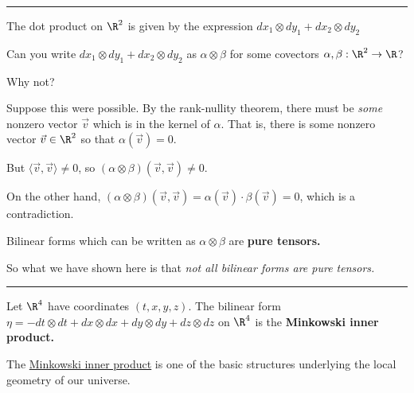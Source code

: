 \documentclass{ximera}
\begin{document}
\hrule

\begin{example}
  The dot product on $\R^2$ is given by the expression $dx_1 \otimes dy_1 + dx_2 \otimes dy_2$
\end{example}

\begin{question}
  Can you write $dx_1 \otimes dy_1 + dx_2 \otimes dy_2$ as $\alpha \otimes \beta$ for some covectors $\alpha, \beta : \R^2 \to \R$?

  \begin{solution}
    \begin{multiple-choice}
    \end{multiple-choice}
  \end{solution}

  Why not?
  \begin{free-response}
    Suppose this were possible.  By the rank-nullity theorem, there must be \textit{some} nonzero vector $\vec{v}$ which is in the kernel of $\alpha$.  That is, there is some nonzero vector $\vec{v} \in \R^2$ so that $\alpha(\vec{v}) = 0$.

    But $\langle \vec{v}, \vec{v} \rangle \neq 0$, so $(\alpha \otimes \beta)(\vec{v}, \vec{v}) \neq 0$.

    On the other hand, $(\alpha \otimes \beta)(\vec{v}, \vec{v}) = \alpha(\vec{v}) \cdot \beta(\vec{v}) = 0$, which is a contradiction.
  \end{free-response}

  \begin{definition}
    Bilinear forms which can be written as $\alpha \otimes \beta$ are \textbf{pure tensors.}
  \end{definition}
  
  So what we have shown here is that \textit{not all bilinear forms are pure tensors.}
\end{question}

\hrule

\begin{example}
  Let $\R^4$ have coordinates $(t,x,y,z)$.  The bilinear form $\eta = -dt \otimes dt +dx \otimes dx + dy\otimes dy + dz \otimes dz $ on $\R^4$ is the \textbf{Minkowski inner product.}
\end{example}

The \href{http://en.wikipedia.org/wiki/Minkowski_space}{Minkowski
  inner product} is one of the basic structures underlying the local
geometry of our universe.

	
	
\end{document}
